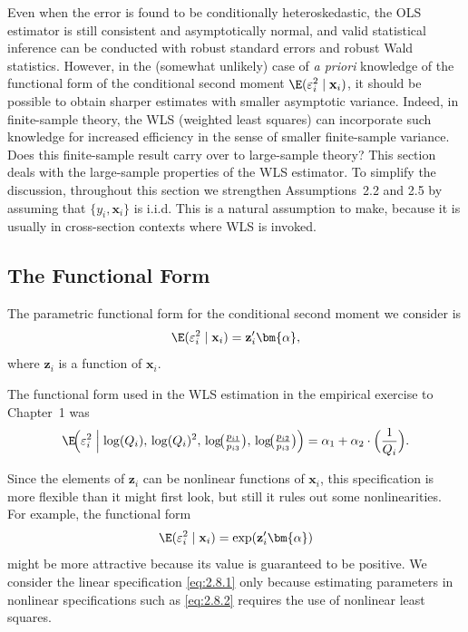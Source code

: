 
Even when the error is found to be conditionally heteroskedastic, the OLS estimator is
still consistent and asymptotically normal, and valid statistical inference can be
conducted with robust standard errors and robust Wald statistics.  However, in the
(somewhat unlikely) case of \emph{a priori} knowledge of the functional form of the
conditional second moment $\E(\varepsilon_i^2 \mid \mathbf{x}_i)$, it should be possible
to obtain sharper estimates with smaller asymptotic variance.  Indeed, in finite-sample
theory, the WLS (weighted least squares) can incorporate such knowledge for increased
efficiency in the sense of smaller finite-sample variance.  Does this finite-sample result
carry over to large-sample theory?  This section deals with the large-sample properties
of the WLS estimator.  To simplify the discussion, throughout this section we strengthen
Assumptions~2.2 and 2.5 by assuming that $\{y_i, \mathbf{x}_i\}$ is i.i.d.  This is a
natural assumption to make, because it is usually in cross-section contexts where WLS is
invoked.

\subsection*{The Functional Form}

The parametric functional form for the conditional second moment we consider is
\begin{equation}
  \E(\varepsilon_i^2 \mid \mathbf{x}_i) = \mathbf{z}_i' \bm{\alpha},
  \label{eq:2.8.1}
\end{equation}
where $\mathbf{z}_i$ is a function of $\mathbf{x}_i$.

\begin{example}
\label{ex:2.8}
The functional form used in the WLS estimation in the empirical exercise to Chapter~1 was
\[
  \E\!\Bigl(\varepsilon_i^2 \Bigm| \log(Q_i),\, \log(Q_i)^2,\,
    \log\!\bigl(\tfrac{p_{i1}}{p_{i3}}\bigr),\,
    \log\!\bigl(\tfrac{p_{i2}}{p_{i3}}\bigr)\Bigr)
    = \alpha_1 + \alpha_2 \cdot \Bigl(\frac{1}{Q_i}\Bigr).
\]
\end{example}

Since the elements of $\mathbf{z}_i$ can be nonlinear functions of $\mathbf{x}_i$, this
specification is more flexible than it might first look, but still it rules out some
nonlinearities.  For example, the functional form
\begin{equation}
  \E(\varepsilon_i^2 \mid \mathbf{x}_i) = \exp(\mathbf{z}_i' \bm{\alpha})
  \label{eq:2.8.2}
\end{equation}
might be more attractive because its value is guaranteed to be positive.  We consider the
linear specification \eqref{eq:2.8.1} only because estimating parameters in nonlinear
specifications such as \eqref{eq:2.8.2} requires the use of nonlinear least squares.


